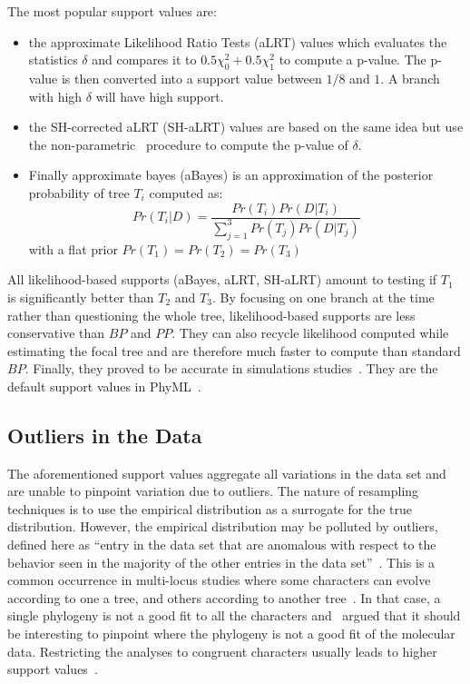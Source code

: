 The most popular support values are:
\begin{itemize}
 \item the approximate Likelihood Ratio Tests (aLRT) values which evaluates the statistics $\delta$ and compares it to $0.5\chi^2_0 + 0.5\chi^2_1$ to compute a p-value. The p-value is then converted into a support value between $1/8$ and $1$. A branch with high $\delta$ will have high support. 
 \item the SH-corrected aLRT (SH-aLRT) values are based on the same idea but use the non-parametric~\citet{Shimodaira1999} procedure to compute the p-value of $\delta$.
 \item Finally approximate bayes (aBayes) is an approximation of the posterior probability of tree $T_i$ computed as:
 \[
  Pr(T_i | D) = \frac{Pr(T_i) Pr(D | T_i)}{\sum_{j=1}^3 Pr(T_j) Pr(D | T_j)}
 \]
 with a flat prior $Pr(T_1) = Pr(T_2)= Pr(T_3)$
\end{itemize}

All likelihood-based supports (aBayes, aLRT, SH-aLRT) amount to testing if $T_1$ is significantly better than $T_2$ and $T_3$. By focusing on one branch at the time rather than questioning the whole tree, likelihood-based supports are less conservative than $BP$ and $PP$. They can also recycle likelihood computed while estimating the focal tree and are therefore much faster to compute than standard $BP$. Finally, they proved to be accurate in simulations studies~\citep{Anisimova2011}. They are the default support values in PhyML~\citep{Guindon2003}. 

\subsection{Outliers in the Data} \label{sec:outliers}

The aforementioned support values aggregate all variations in the data set and are unable to pinpoint variation due to outliers. The nature of resampling techniques is to use the empirical distribution as a surrogate for the true distribution. However, the empirical distribution may be polluted by outliers, defined here as ``entry in the data set that are anomalous with respect to
the behavior seen in the majority of the other entries in the data set''~\citep{Barnett1994}. This is a common occurrence in multi-locus studies where some characters can evolve according to one a tree, and others according to another tree~\citep{Degnan2009}. In that case, a single phylogeny is not a good fit to all the characters and~\citet{Swofford1996} argued that it should be interesting to pinpoint where the phylogeny is not a good fit of the molecular data. Restricting the analyses to congruent characters usually leads to higher support values~\citep{Bar-Hen2008}.

